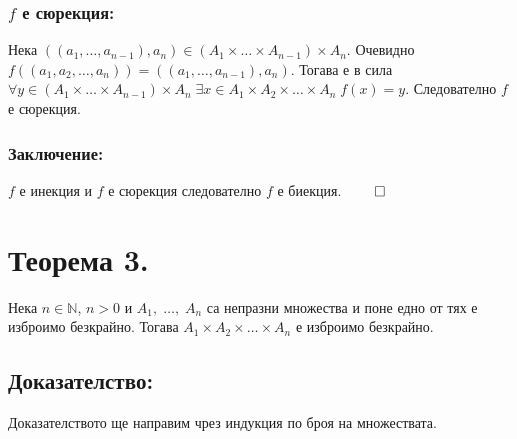 \documentclass[a4paper, 12pt, oneside]{article}
\newcommand{\N}{\mathbb{N}}
\begin{document}
\subsubsection*{\(f\) е сюрекция:}
Нека \(((a_1, \dots, a_{n - 1}), a_n) \in (A_1 \times \dots \times A_{n - 1}) \times A_n\).
Очевидно \(f((a_1, a_2, \dots, a_n)) = ((a_1, \dots, a_{n - 1}), a_n)\). Тогава е в сила \\
\(\forall y \in (A_1 \times \dots \times A_{n - 1}) \times A_n \; \exists x \in A_1 \times A_2 \times \dots \times A_n \; f(x) = y\).
Следователно \(f\) е сюрекция.
\subsubsection*{Заключение:}
\(f\) е инекция и \(f\) е сюрекция следователно \(f\) е биекция. \(\qed\)
\section*{Теорема 3.}
Нека \(n \in \N\), \(n > 0\) и \(A_1, \; \dots, \; A_n\)
са непразни множества и поне едно от тях е изброимо безкрайно.
Тогава \(A_1 \times A_2 \times \dots \times A_n\) е изброимо безкрайно.
\subsection*{Доказателство:}
Доказателството ще направим чрез индукция по броя на множествата.
\end{document}
